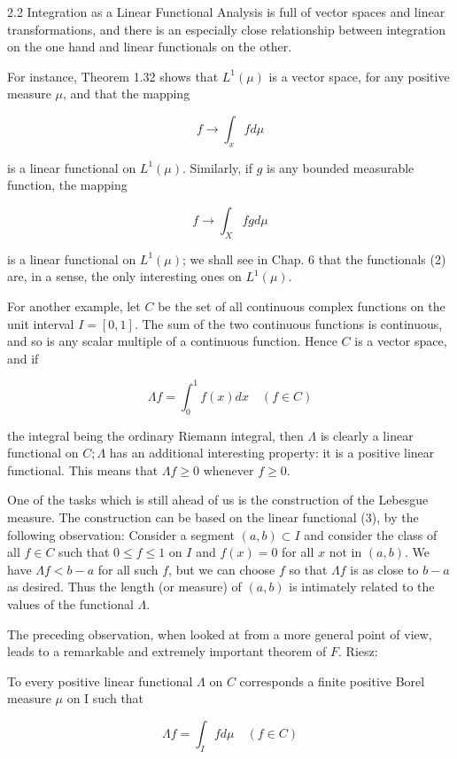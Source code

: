 \documentclass[10pt]{article}
\begin{document}
2.2 Integration as a Linear Functional Analysis is full of vector spaces and linear transformations, and there is an especially close relationship between integration on the one hand and linear functionals on the other.

For instance, Theorem 1.32 shows that $L^{1}(\mu)$ is a vector space, for any positive measure $\mu$, and that the mapping

$$
f \rightarrow \int_{x} f d \mu
$$

is a linear functional on $L^{1}(\mu)$. Similarly, if $g$ is any bounded measurable function, the mapping

$$
f \rightarrow \int_{X} f g d \mu
$$

is a linear functional on $L^{1}(\mu)$; we shall see in Chap. 6 that the functionals (2) are, in a sense, the only interesting ones on $L^{1}(\mu)$.

For another example, let $C$ be the set of all continuous complex functions on the unit interval $I=[0,1]$. The sum of the two continuous functions is continuous, and so is any scalar multiple of a continuous function. Hence $C$ is a vector space, and if

$$
\Lambda f=\int_{0}^{1} f(x) d x \quad(f \in C)
$$

the integral being the ordinary Riemann integral, then $\Lambda$ is clearly a linear functional on $C ; \Lambda$ has an additional interesting property: it is a positive linear functional. This means that $\Lambda f \geq 0$ whenever $f \geq 0$.

One of the tasks which is still ahead of us is the construction of the Lebesgue measure. The construction can be based on the linear functional (3), by the following observation: Consider a segment $(a, b) \subset I$ and consider the class of all $f \in C$ such that $0 \leq f \leq 1$ on $I$ and $f(x)=0$ for all $x$ not in $(a, b)$. We have $\Lambda f<b-a$ for all such $f$, but we can choose $f$ so that $\Lambda f$ is as close to $b-a$ as desired. Thus the length (or measure) of $(a, b)$ is intimately related to the values of the functional $\Lambda$.

The preceding observation, when looked at from a more general point of view, leads to a remarkable and extremely important theorem of $F$. Riesz:

To every positive linear functional $\Lambda$ on $C$ corresponds a finite positive Borel measure $\mu$ on I such that

$$
\Lambda f=\int_{I} f d \mu \quad(f \in C)
$$
\end{document}
